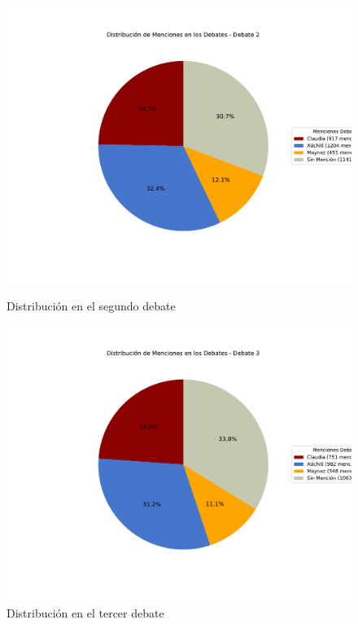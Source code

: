 \documentclass[10pt, a4paper]{article}
\begin{document}
	\begin{figure}[h!]
		\centering
		\begin{minipage}{0.49\textwidth} %
			\includegraphics[width=\linewidth]{grafica_debate2.pdf} 
			\caption{Distribución en el segundo debate}
			\label{fig:distrDebate2}
		\end{minipage}
		\hfill %
		\begin{minipage}{0.49\textwidth}
			\includegraphics[width=\linewidth]{grafica_debate3.pdf}
			\caption{Distribución en el tercer debate}
			\label{fig:distrDebate3}
		\end{minipage}
	\end{figure}
\end{document}
